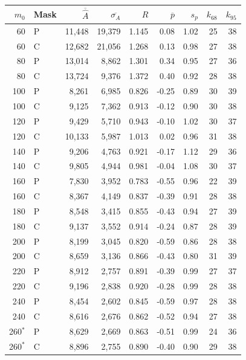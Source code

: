 \begin{tabular}{rlrrrrrrr}
\toprule
$m_0$ & Mask & $\overline{\widehat A}$ & $\overline{\sigma_A}$ & $R$ & $\overline p$ & $s_p$ & $k_{68}$ & $k_{95}$ \\
\midrule
60 & P & 11,448 & 19,379 & 1.145 & 0.08 & 1.02 & 25 & 38 \\
60 & C & 12,682 & 21,056 & 1.268 & 0.13 & 0.98 & 27 & 38 \\
80 & P & 13,014 & 8,862 & 1.301 & 0.34 & 0.95 & 27 & 36 \\
80 & C & 13,724 & 9,376 & 1.372 & 0.40 & 0.92 & 28 & 38 \\
100 & P & 8,261 & 6,985 & 0.826 & -0.25 & 0.89 & 30 & 39 \\
100 & C & 9,125 & 7,362 & 0.913 & -0.12 & 0.90 & 30 & 38 \\
120 & P & 9,429 & 5,710 & 0.943 & -0.10 & 1.02 & 30 & 37 \\
120 & C & 10,133 & 5,987 & 1.013 & 0.02 & 0.96 & 31 & 38 \\
140 & P & 9,206 & 4,763 & 0.921 & -0.17 & 1.12 & 29 & 36 \\
140 & C & 9,805 & 4,944 & 0.981 & -0.04 & 1.08 & 30 & 37 \\
160 & P & 7,830 & 3,952 & 0.783 & -0.55 & 0.96 & 22 & 39 \\
160 & C & 8,367 & 4,149 & 0.837 & -0.39 & 0.91 & 28 & 38 \\
180 & P & 8,548 & 3,415 & 0.855 & -0.43 & 0.94 & 27 & 39 \\
180 & C & 9,137 & 3,552 & 0.914 & -0.24 & 0.87 & 28 & 39 \\
200 & P & 8,199 & 3,045 & 0.820 & -0.59 & 0.86 & 28 & 38 \\
200 & C & 8,659 & 3,136 & 0.866 & -0.43 & 0.80 & 31 & 39 \\
220 & P & 8,912 & 2,757 & 0.891 & -0.39 & 0.99 & 27 & 37 \\
220 & C & 9,196 & 2,838 & 0.920 & -0.28 & 0.99 & 28 & 38 \\
240 & P & 8,454 & 2,602 & 0.845 & -0.59 & 0.97 & 28 & 38 \\
240 & C & 8,616 & 2,676 & 0.862 & -0.52 & 0.94 & 27 & 38 \\
260$^{*}$ & P & 8,629 & 2,669 & 0.863 & -0.51 & 0.99 & 24 & 36 \\
260$^{*}$ & C & 8,896 & 2,755 & 0.890 & -0.40 & 0.90 & 29 & 38 \\
\bottomrule
\end{tabular}
